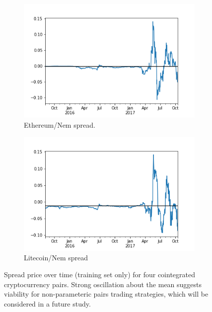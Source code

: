 \documentclass{article}
\begin{document}
\begin{figure}
    \vspace{1cm}
    \begin{subfigure}[t]{0.49\textwidth}
        \centering
        \includegraphics[width=1.0\linewidth]{Spread3.png} 
        \caption{Ethereum/Nem spread.} \label{fig:EN}
    \end{subfigure}
    \hfill
     \begin{subfigure}[t]{0.49\textwidth}
        \centering
        \includegraphics[width=1.0\linewidth]{Spread4.png} 
        \caption{Litecoin/Nem spread} \label{fig:LN}
    \end{subfigure}
    \caption{Spread price over time (training set only) for four cointegrated cryptocurrency pairs. Strong oscillation about the mean suggests viability for non-parameteric pairs trading strategies, which will be considered in a future study.} \label{SpreadPrices}
\end{figure}
\end{document}
